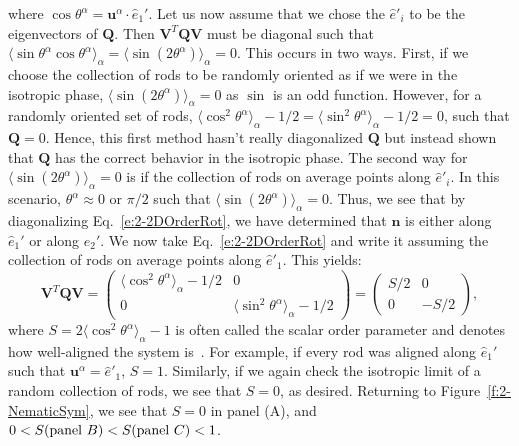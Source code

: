 where $\cos \theta^{\alpha} = \mathbf{u}^{\alpha} \cdot \hat{e}_1'$.
Let us now assume that we chose the $\hat{e}'_i$ to be the eigenvectors of $\mathbf{Q}$.
Then $ \mathbf{V}^T \mathbf{Q} \mathbf{V}$ must be diagonal such that $\langle \sin \theta^{\alpha} \cos \theta^{\alpha} \rangle_{\alpha} = \langle \sin (2 \theta^{\alpha}) \rangle_{\alpha} = 0$.
This occurs in two ways.
First, if we choose the collection of rods to be randomly oriented as if we were in the isotropic phase, $\langle \sin (2 \theta^{\alpha}) \rangle_{\alpha} = 0$ as $\sin$ is an odd function.
However, for a randomly oriented set of rods, $\langle \cos^2 \theta^{\alpha}\rangle_{\alpha} - 1/2 = \langle \sin^2 \theta^{\alpha}\rangle_{\alpha} - 1/2 = 0$, such that $\mathbf{Q} = 0$.
Hence, this first method hasn't really diagonalized $\mathbf{Q}$ but instead shown that $\mathbf{Q}$ has the correct behavior in the isotropic phase.
The second way for $\langle \sin (2 \theta^{\alpha}) \rangle_{\alpha} = 0$ is if the collection of rods on average points along $\hat{e}'_i$.
In this scenario, $\theta^{\alpha} \approx 0 \textrm{ or } \pi/2$ such that $\langle \sin (2 \theta^{\alpha}) \rangle_{\alpha} = 0$.
Thus, we see that by diagonalizing Eq.~\ref{e:2-2DOrderRot}, we have determined that $\mathbf{n}$ is either along $\hat{e}_1'$ or along $\hat{e}_2'$.
We now take Eq.~\ref{e:2-2DOrderRot} and write it assuming the collection of rods on average points along $\hat{e}'_1$.
This yields:
\begin{equation}
  \mathbf{V}^T \mathbf{Q} \mathbf{V} =
  \begin{pmatrix}
    \langle \cos^2 \theta^{\alpha}\rangle_{\alpha} - 1/2 & 0 \\
    0 & \langle \sin^2 \theta^{\alpha} \rangle_{\alpha} - 1/2
  \end{pmatrix} =
  \begin{pmatrix}
    S/2 & 0 \\
    0 & -S/2
  \end{pmatrix},\label{e:2-2DOrderDiagBig}
\end{equation}
where $S = 2 \langle \cos^2 \theta^{\alpha} \rangle_{\alpha} - 1$ is often called the scalar order parameter and denotes how well-aligned the system is~\cite{RN33}.
For example, if every rod was aligned along $\hat{e}_1'$ such that $\mathbf{u}^{\alpha} = \hat{e}'_1$, $S = 1$.
Similarly, if we again check the isotropic limit of a random collection of rods, we see that $S = 0$, as desired.
Returning to Figure~\ref{f:2-NematicSym}, we see that $S=0$ in panel (A), and $0 < S(\textup{panel }B) < S(\textup{panel }C) < 1$.
